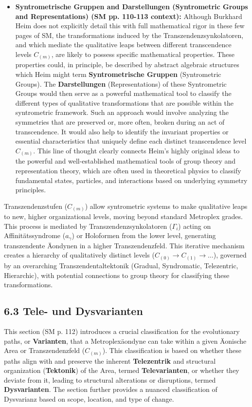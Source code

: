 \documentclass[12pt]{article}
\begin{document}
\begin{itemize}
    \item \textbf{Syntrometrische Gruppen and Darstellungen (Syntrometric Groups and Representations) (SM pp. 110-113 context):}
    Although Burkhard Heim does not explicitly detail this with full mathematical rigor in these few pages of SM, the transformations induced by the Transzendenzsynkolatoren, and which mediate the qualitative leaps between different transcendence levels \( C_{(m)} \), are likely to possess specific mathematical properties. These properties could, in principle, be described by abstract algebraic structures which Heim might term \textbf{Syntrometrische Gruppen} (Syntrometric Groups). The \textbf{Darstellungen} (Representations) of these Syntrometric Groups would then serve as a powerful mathematical tool to classify the different types of qualitative transformations that are possible within the syntrometric framework. Such an approach would involve analyzing the symmetries that are preserved or, more often, broken during an act of transcendence. It would also help to identify the invariant properties or essential characteristics that uniquely define each distinct transcendence level \( C_{(m)} \). This line of thought clearly connects Heim's highly original ideas to the powerful and well-established mathematical tools of group theory and representation theory, which are often used in theoretical physics to classify fundamental states, particles, and interactions based on underlying symmetry principles.
\end{itemize}

Transzendenzstufen (\(C_{(m)}\)) allow syntrometric systems to make qualitative leaps to new, higher organizational levels, moving beyond standard Metroplex grades. This process is mediated by Transzendenzsynkolatoren (\(\Gamma_i\)) acting on Affinitätssyndrome (\(a_\gamma\)) or Holoformen from the lower level, generating transzendente Äondynen in a higher Transzendenzfeld. This iterative mechanism creates a hierarchy of qualitatively distinct levels (\(C_{(0)} \to C_{(1)} \to \dots\)), governed by an overarching Transzendentaltektonik (Gradual, Syndromatic, Telezentric, Hierarchic), with potential connections to group theory for classifying these transformations.

\subsection{6.3 Tele- und Dysvarianten}
\label{sec:tele_dysvarianten}

This section (SM p. 112) introduces a crucial classification for the evolutionary paths, or \textbf{Varianten}, that a Metroplexäondyne can take within a given Äonische Area or Transzendenzfeld (\(C_{(m)}\)). This classification is based on whether these paths align with and preserve the inherent \textbf{Telezentrik} and structural organization (\textbf{Tektonik}) of the Area, termed \textbf{Televarianten}, or whether they deviate from it, leading to structural alterations or disruptions, termed \textbf{Dysvarianten}. The section further provides a nuanced classification of Dysvarianz based on scope, location, and type of change.
\end{document}
